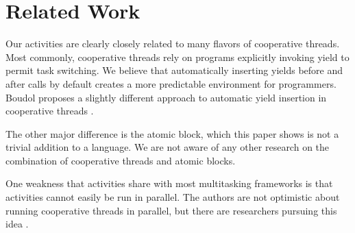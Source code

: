 \documentclass[sigplan,10pt,review,anonymous]{acmart}\settopmatter{printfolios=true,printccs=false,printacmref=false}
\begin{document}



\section{Related Work}

Our activities are clearly closely related to many flavors of cooperative threads.
Most commonly, cooperative threads rely on programs explicitly invoking yield to permit task switching.
We believe that automatically inserting yields before and after calls by default creates a more predictable environment for programmers.
Boudol proposes a slightly different approach to automatic yield insertion in cooperative threads \cite{Boudol2007}.

The other major difference is the atomic block, which this paper shows is not a trivial addition to a language.
We are not aware of any other research on the combination of cooperative threads and atomic blocks.

One weakness that activities share with most multitasking frameworks is that activities cannot easily be run in parallel.
The authors are not optimistic about running cooperative threads in parallel, but there are researchers pursuing this idea \cite{ONeill2015, Boussinot2006, Dabrowski2006}.
\end{document}
